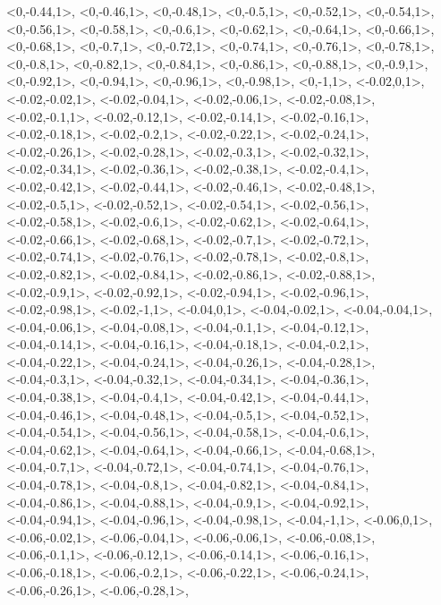 \documentclass[a4paper,10pt]{article}
\begin{document}
\begin{eulernotebook}
\begin{euleroutput}
  <0,-0.44,1>,
  <0,-0.46,1>,
  <0,-0.48,1>,
  <0,-0.5,1>,
  <0,-0.52,1>,
  <0,-0.54,1>,
  <0,-0.56,1>,
  <0,-0.58,1>,
  <0,-0.6,1>,
  <0,-0.62,1>,
  <0,-0.64,1>,
  <0,-0.66,1>,
  <0,-0.68,1>,
  <0,-0.7,1>,
  <0,-0.72,1>,
  <0,-0.74,1>,
  <0,-0.76,1>,
  <0,-0.78,1>,
  <0,-0.8,1>,
  <0,-0.82,1>,
  <0,-0.84,1>,
  <0,-0.86,1>,
  <0,-0.88,1>,
  <0,-0.9,1>,
  <0,-0.92,1>,
  <0,-0.94,1>,
  <0,-0.96,1>,
  <0,-0.98,1>,
  <0,-1,1>,
  <-0.02,0,1>,
  <-0.02,-0.02,1>,
  <-0.02,-0.04,1>,
  <-0.02,-0.06,1>,
  <-0.02,-0.08,1>,
  <-0.02,-0.1,1>,
  <-0.02,-0.12,1>,
  <-0.02,-0.14,1>,
  <-0.02,-0.16,1>,
  <-0.02,-0.18,1>,
  <-0.02,-0.2,1>,
  <-0.02,-0.22,1>,
  <-0.02,-0.24,1>,
  <-0.02,-0.26,1>,
  <-0.02,-0.28,1>,
  <-0.02,-0.3,1>,
  <-0.02,-0.32,1>,
  <-0.02,-0.34,1>,
  <-0.02,-0.36,1>,
  <-0.02,-0.38,1>,
  <-0.02,-0.4,1>,
  <-0.02,-0.42,1>,
  <-0.02,-0.44,1>,
  <-0.02,-0.46,1>,
  <-0.02,-0.48,1>,
  <-0.02,-0.5,1>,
  <-0.02,-0.52,1>,
  <-0.02,-0.54,1>,
  <-0.02,-0.56,1>,
  <-0.02,-0.58,1>,
  <-0.02,-0.6,1>,
  <-0.02,-0.62,1>,
  <-0.02,-0.64,1>,
  <-0.02,-0.66,1>,
  <-0.02,-0.68,1>,
  <-0.02,-0.7,1>,
  <-0.02,-0.72,1>,
  <-0.02,-0.74,1>,
  <-0.02,-0.76,1>,
  <-0.02,-0.78,1>,
  <-0.02,-0.8,1>,
  <-0.02,-0.82,1>,
  <-0.02,-0.84,1>,
  <-0.02,-0.86,1>,
  <-0.02,-0.88,1>,
  <-0.02,-0.9,1>,
  <-0.02,-0.92,1>,
  <-0.02,-0.94,1>,
  <-0.02,-0.96,1>,
  <-0.02,-0.98,1>,
  <-0.02,-1,1>,
  <-0.04,0,1>,
  <-0.04,-0.02,1>,
  <-0.04,-0.04,1>,
  <-0.04,-0.06,1>,
  <-0.04,-0.08,1>,
  <-0.04,-0.1,1>,
  <-0.04,-0.12,1>,
  <-0.04,-0.14,1>,
  <-0.04,-0.16,1>,
  <-0.04,-0.18,1>,
  <-0.04,-0.2,1>,
  <-0.04,-0.22,1>,
  <-0.04,-0.24,1>,
  <-0.04,-0.26,1>,
  <-0.04,-0.28,1>,
  <-0.04,-0.3,1>,
  <-0.04,-0.32,1>,
  <-0.04,-0.34,1>,
  <-0.04,-0.36,1>,
  <-0.04,-0.38,1>,
  <-0.04,-0.4,1>,
  <-0.04,-0.42,1>,
  <-0.04,-0.44,1>,
  <-0.04,-0.46,1>,
  <-0.04,-0.48,1>,
  <-0.04,-0.5,1>,
  <-0.04,-0.52,1>,
  <-0.04,-0.54,1>,
  <-0.04,-0.56,1>,
  <-0.04,-0.58,1>,
  <-0.04,-0.6,1>,
  <-0.04,-0.62,1>,
  <-0.04,-0.64,1>,
  <-0.04,-0.66,1>,
  <-0.04,-0.68,1>,
  <-0.04,-0.7,1>,
  <-0.04,-0.72,1>,
  <-0.04,-0.74,1>,
  <-0.04,-0.76,1>,
  <-0.04,-0.78,1>,
  <-0.04,-0.8,1>,
  <-0.04,-0.82,1>,
  <-0.04,-0.84,1>,
  <-0.04,-0.86,1>,
  <-0.04,-0.88,1>,
  <-0.04,-0.9,1>,
  <-0.04,-0.92,1>,
  <-0.04,-0.94,1>,
  <-0.04,-0.96,1>,
  <-0.04,-0.98,1>,
  <-0.04,-1,1>,
  <-0.06,0,1>,
  <-0.06,-0.02,1>,
  <-0.06,-0.04,1>,
  <-0.06,-0.06,1>,
  <-0.06,-0.08,1>,
  <-0.06,-0.1,1>,
  <-0.06,-0.12,1>,
  <-0.06,-0.14,1>,
  <-0.06,-0.16,1>,
  <-0.06,-0.18,1>,
  <-0.06,-0.2,1>,
  <-0.06,-0.22,1>,
  <-0.06,-0.24,1>,
  <-0.06,-0.26,1>,
  <-0.06,-0.28,1>,

\end{euleroutput}
\end{eulernotebook}
\end{document}
